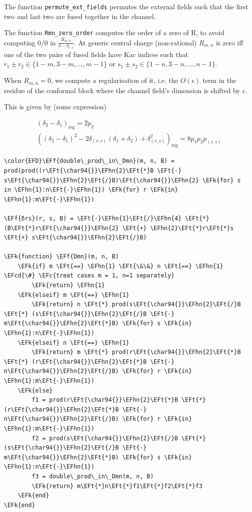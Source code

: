 \documentclass[a4paper]{article}
\numberwithin{equation}{section}
\newcommand{\EFc}[1]{\textcolor{EFc}{#1}} %
\newcommand{\EFcd}[1]{\textcolor{EFcd}{#1}} %
\newcommand{\EFk}[1]{\textcolor{EFk}{#1}} %
\newcommand{\EFf}[1]{\textcolor{EFf}{#1}} %
\newcommand{\EFt}[1]{\textcolor{EFt}{#1}} %
\newcommand{\EFhn}[1]{\textcolor{EFhn}{#1}} %
\begin{document}
\begin{itemize}
The function \texttt{permute\_ext\_fields} permutes the external fields such that the first two and last two are fused together in the channel.

The function \texttt{Rmn\_zero\_order} computes the order of a zero of R, to avoid computing 0/0 in \(\frac{R_{m,n}}{\delta - \delta_{r,s}}\). At generic central charge (non-rational) \(R_{m,n}\) is zero iff one of the two pairs of fused fields have Kac indices such that \(r_1 \pm r_2 \in \{1-m, 3-m, \dots, m-1\}\) or \(s_1 \pm s_2 \in \{1-n, 3-n, \dots, n-1\}\).

When \(R_{m,n}=0\), we compute a regularisation of it, i.e. the \(O(\epsilon)\) term in the residue of the conformal block where the channel field's dimension is shifted by \(\epsilon\).

This is given by (some expression)

\begin{align}
&\left(\delta_2-\delta_1\right)_\text{reg} = 2p_2 \\
&\left((\delta_2-\delta_1)^2 -2\delta_{(r,s)}(\delta_1+\delta_2) + \delta_{(r,s)}^2\right)_\text{reg} = 8p_1p_2p_{(r,s)}
\end{align}

\begin{Code}
\begin{Verbatim}
\color{EFD}\EFf{double\_prod\_in\_Dmn}(m, n, B) = prod(prod((r\EFt{\char94{}}\EFhn{2}\EFt{*}B \EFt{-} s\EFt{\char94{}}\EFhn{2}\EFt{/}B)\EFt{\char94{}}\EFhn{2} \EFk{for} s in \EFhn{1}:n\EFt{-}\EFhn{1}) \EFk{for} r \EFk{in} \EFhn{1}:m\EFt{-}\EFhn{1})

\EFf{δrs}(r, s, B) = \EFt{-}\EFhn{1}\EFt{/}\EFhn{4} \EFt{*} (B\EFt{*}r\EFt{\char94{}}\EFhn{2} \EFt{+} \EFhn{2}\EFt{*}r\EFt{*}s \EFt{+} s\EFt{\char94{}}\EFhn{2}\EFt{/}B)

\EFk{function} \EFf{Dmn}(m, n, B)
    \EFk{if} m \EFt{==} \EFhn{1} \EFt{\&\&} n \EFt{==} \EFhn{1} \EFcd{\#} \EFc{treat cases m = 1, n=1 separately}
        \EFk{return} \EFhn{1}
    \EFk{elseif} m \EFt{==} \EFhn{1}
        \EFk{return} n \EFt{*} prod(s\EFt{\char94{}}\EFhn{2}\EFt{/}B \EFt{*} (s\EFt{\char94{}}\EFhn{2}\EFt{/}B \EFt{-} m\EFt{\char94{}}\EFhn{2}\EFt{*}B) \EFk{for} s \EFk{in} \EFhn{1}:n\EFt{-}\EFhn{1})
    \EFk{elseif} n \EFt{==} \EFhn{1}
        \EFk{return} m \EFt{*} prod(r\EFt{\char94{}}\EFhn{2}\EFt{*}B \EFt{*} (r\EFt{\char94{}}\EFhn{2}\EFt{*}B \EFt{-} n\EFt{\char94{}}\EFhn{2}\EFt{/}B) \EFk{for} r \EFk{in} \EFhn{1}:m\EFt{-}\EFhn{1})
    \EFk{else}
        f1 = prod(r\EFt{\char94{}}\EFhn{2}\EFt{*}B \EFt{*} (r\EFt{\char94{}}\EFhn{2}\EFt{*}B \EFt{-} n\EFt{\char94{}}\EFhn{2}\EFt{/}B) \EFk{for} r \EFk{in} \EFhn{1}:m\EFt{-}\EFhn{1})
        f2 = prod(s\EFt{\char94{}}\EFhn{2}\EFt{/}B \EFt{*} (s\EFt{\char94{}}\EFhn{2}\EFt{/}B \EFt{-} m\EFt{\char94{}}\EFhn{2}\EFt{*}B) \EFk{for} s \EFk{in} \EFhn{1}:n\EFt{-}\EFhn{1})
        f3 = double\_prod\_in\_Dmn(m, n, B)
        \EFk{return} m\EFt{*}n\EFt{*}f1\EFt{*}f2\EFt{*}f3
    \EFk{end}
\EFk{end}


\end{Verbatim}
\end{Code}
\end{itemize}
\end{document}
